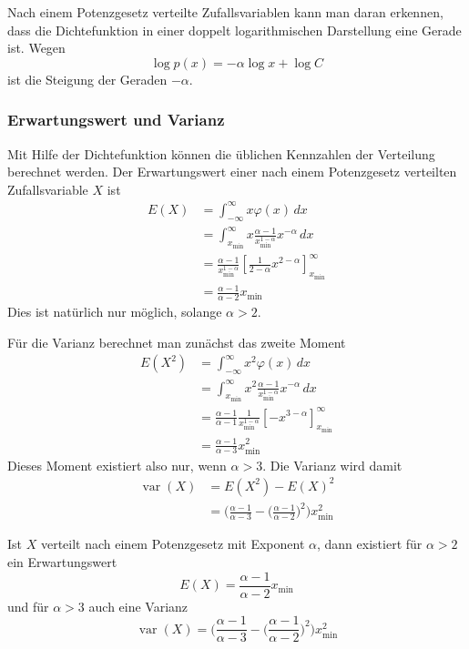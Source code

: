 Nach einem Potenzgesetz verteilte Zufallsvariablen kann man daran
erkennen, dass die Dichtefunktion in einer doppelt logarithmischen
Darstellung eine Gerade ist.
Wegen
\[
\log p(x)=-\alpha \log x+\log C
\]
ist die Steigung der Geraden $-\alpha$.

\subsubsection{Erwartungswert und Varianz}
Mit Hilfe der Dichtefunktion können die üblichen Kennzahlen der Verteilung
berechnet werden.
Der Erwartungswert einer nach einem Potenzgesetz verteilten Zufallsvariable $X$
ist
\begin{align*}
E(X)&=
\int_{-\infty}^\infty x\varphi(x)\,dx
\\
&=
\int_{x_{\min}}^\infty 
x
\frac{\alpha-1}{x_{\min}^{1-\alpha}}
x^{-\alpha}\,dx
\\
&=
\frac{\alpha-1}{x_{\min}^{1-\alpha}}
\left[\frac{1}{2-\alpha}x^{2-\alpha}\right]_{x_{\min}}^\infty
\\
&=
\frac{\alpha-1}{\alpha-2}x_{\min}
\end{align*}
Dies ist natürlich nur möglich, solange $\alpha > 2$.

Für die Varianz berechnet man zunächst das zweite Moment
\begin{align*}
E(X^2)&=
\int_{-\infty}^\infty x^2\varphi(x)\,dx
\\
&=
\int_{x_{\min}}^\infty 
x^2
\frac{\alpha-1}{x_{\min}^{1-\alpha}}
x^{-\alpha}\,dx
\\
&=
\frac{\alpha-1}{\alpha-1}\frac1{x_{\min}^{1-\alpha}}\left[-x^{3-\alpha}\right]_{x_{\min}}^\infty
\\
&=
\frac{\alpha-1}{\alpha-3}x_{\min}^2
\end{align*}
Dieses Moment existiert also nur, wenn $\alpha >3$.
Die Varianz wird damit
\begin{align*}
\operatorname{var}(X)
&=
E(X^2)-E(X)^2
\\
&=
\biggl(
\frac{\alpha-1}{\alpha-3}-\biggl(\frac{\alpha-1}{\alpha-2}\biggr)^2
\biggr)x_{\min}^2
\end{align*}
\begin{satz}
Ist $X$ verteilt nach einem Potenzgesetz mit Exponent $\alpha$, dann
existiert für $\alpha>2$ ein Erwartungswert
\[
E(X)
=
\frac{\alpha-1}{\alpha-2}x_{\min}
\]
und für $\alpha >3$ auch eine Varianz
\[
\operatorname{var}(X)
=
\biggl(
\frac{\alpha-1}{\alpha-3}-\biggl(\frac{\alpha-1}{\alpha-2}\biggr)^2
\biggr)x_{\min}^2
\]
\end{satz}

